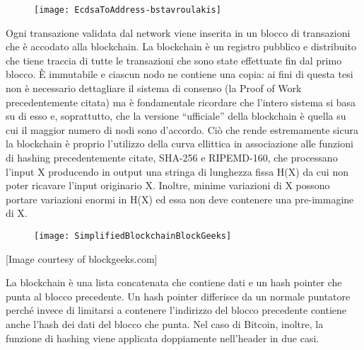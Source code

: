 \begin{figure}[h!]
\centering
\texttt{[image: EcdsaToAddress-bstavroulakis]}
\caption[Img from bstavroulakis.com]{}
\caption{}
\label{fig:ecdsatoaddress-bstavroulakis}
\end{figure}


Ogni transazione validata dal network viene inserita in un blocco di transazioni che è accodato alla blockchain.
La blockchain è un registro pubblico e distribuito che tiene traccia di tutte le transazioni che sono state effettuate fin dal primo blocco. È immutabile e ciascun nodo ne contiene una copia: ai fini di questa tesi non è necessario dettagliare il sistema di consenso (la Proof of Work precedentemente citata) ma è fondamentale ricordare che l’intero sistema si basa su di esso e, soprattutto, che la versione “ufficiale” della blockchain è quella su cui il maggior numero di nodi sono d’accordo. Ciò che rende estremamente sicura la blockchain è proprio l’utilizzo della curva ellittica in associazione alle funzioni di hashing precedentemente citate, SHA-256 e RIPEMD-160, che processano l’input X producendo in output una stringa di lunghezza fissa H(X) da cui non poter ricavare l’input originario X. Inoltre, minime variazioni di X possono portare variazioni enormi in H(X) ed essa non deve contenere una pre-immagine di X.

\begin{figure}[h!]
\centering
\texttt{[image: SimplifiedBlockchainBlockGeeks]}
\caption{}
\label{fig:simplifiedblockchainblockgeeks}
\end{figure}

[Image courtesy of blockgeeks.com]

La blockchain è una lista concatenata che contiene dati e un hash pointer che punta al blocco precedente. Un hash pointer differisce da un normale puntatore perché invece di limitarsi a contenere l’indirizzo del blocco precedente contiene anche l’hash dei dati del blocco che punta. Nel caso di Bitcoin, inoltre, la funzione di hashing viene applicata doppiamente nell’header in due casi.\\

